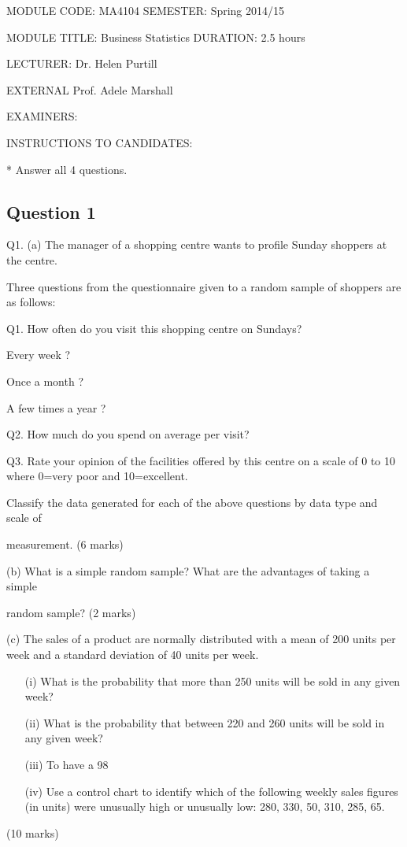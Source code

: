 MODULE CODE: MA4104 SEMESTER: Spring 2014/15

MODULE TITLE: Business Statistics DURATION: 2.5 hours

LECTURER: Dr. Helen Purtill

EXTERNAL Prof. Adele Marshall

EXAMINERS:

INSTRUCTIONS TO CANDIDATES:

* Answer all 4 questions.

\newpage
\subsection*{Question 1}

Q1. (a) The manager of a shopping centre wants to profile Sunday shoppers at the centre.

Three questions from the questionnaire given to a random sample of shoppers are as follows:

\begin{framed}
Q1. How often do you visit this shopping centre on Sundays?

Every week ?

Once a month ?

A few times a year ?

Q2. How much do you spend on average per visit?

Q3. Rate your opinion of the facilities offered by this centre on a scale of 0 to 10 where 0=very poor and 10=excellent.
\end{framed}

Classify the data generated for each of the above questions by data type and scale of

measurement. (6 marks)

(b) What is a simple random sample? What are the advantages of taking a simple

random sample? (2 marks)

(c) The sales of a product are normally distributed with a mean of 200 units per week and a standard deviation of 40 units per week.

\begin{itemize}
\item[(i)] What is the probability that more than 250 units will be sold in any given week?

\item[(ii)] What is the probability that between 220 and 260 units will be sold in any given week?

\item[(iii)] To have a 98%

\item[(iv)] Use a control chart to identify which of the following weekly sales figures (in units) were unusually high or unusually low: 280, 330, 50, 310, 285, 65.

\end{itemize}
(10 marks)

